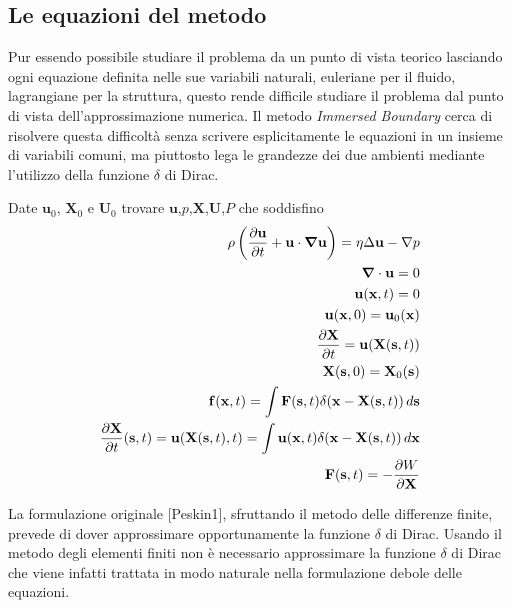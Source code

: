 \subsection{Le equazioni del metodo \IB}
Pur essendo possibile studiare il problema da un punto di vista teorico lasciando ogni equazione definita nelle sue variabili naturali, euleriane per il fluido, lagrangiane per la struttura, questo rende difficile studiare il problema dal punto di vista dell'approssimazione numerica. Il metodo \emph{Immersed Boundary} cerca di risolvere questa difficoltà senza scrivere esplicitamente le equazioni in un insieme di variabili comuni, ma piuttosto lega le grandezze dei due ambienti mediante l'utilizzo della funzione $\delta$ di Dirac.
\begin{problem}
Date $\mathbf{u}_0$, $\mathbf{X}_0$ e $\mathbf{U}_0$ trovare $\mathbf{u}$,$p$,$\mathbf{X}$,$\mathbf{U}$,$P$ che soddisfino
\begin{equation}
\begin{aligned}
\rho \left ( \frac{\partial \mathbf{u}}{\partial t} + \mathbf{u} \cdot \boldsymbol{\nabla} \mathbf{u} \right ) = \eta \Delta \mathbf{u} - \nabla p \\
\boldsymbol{\nabla} \cdot \mathbf{u} = 0 \\
\mathbf{u}(\mathbf{x},t)=0 \\
\mathbf{u}(\mathbf{x},0)=\mathbf{u}_0(\mathbf{x}) \\
\frac{\partial \mathbf{X}}{\partial t} = \mathbf{u}(\mathbf{X}(\mathbf{s},t))\\
\mathbf{X}(\mathbf{s},0)=\mathbf{X}_0(\mathbf{s})\\
\mathbf{f}(\mathbf{x},t)=\int \mathbf{F}(\mathbf{s},t)\delta(\mathbf{x}-\mathbf{X}(\mathbf{s},t))\,d\mathbf{s}\\
\frac{\partial\mathbf{X}}{\partial t}(\mathbf{s},t)=\mathbf{u}(\mathbf{X}(\mathbf{s},t),t)=\int \mathbf{u}(\mathbf{x},t)\delta(\mathbf{x}-\mathbf{X}(\mathbf{s},t))\,d\mathbf{x}\\
\mathbf{F}(\mathbf{s},t)=-\frac{\partial W}{\partial \mathbf{X}}\\
\end{aligned}
\end{equation}
\end{problem}
La formulazione originale [Peskin1], sfruttando il metodo delle differenze finite, prevede di dover approssimare opportunamente la funzione $\delta$ di Dirac. Usando il metodo degli elementi finiti non è necessario approssimare la funzione $\delta$ di Dirac che viene infatti trattata in modo naturale nella formulazione debole delle equazioni.

